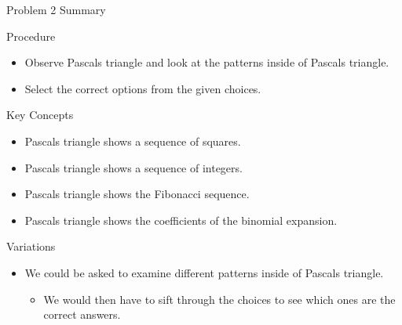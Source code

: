\begin{summary}{Problem 2 Summary}
    \begin{statement}{Procedure}
        \begin{itemize}
            \item Observe Pascals triangle and look at the patterns inside of Pascals triangle.
            \item Select the correct options from the given choices.
        \end{itemize}
    \end{statement}
    \begin{statement}{Key Concepts}
        \begin{itemize}
            \item Pascals triangle shows a sequence of squares.
            \item Pascals triangle shows a sequence of integers.
            \item Pascals triangle shows the Fibonacci sequence.
            \item Pascals triangle shows the coefficients of the binomial expansion.
        \end{itemize}
    \end{statement}
    \begin{statement}{Variations}
        \begin{itemize}
            \item We could be asked to examine different patterns inside of Pascals triangle.
            \begin{itemize}
                \item We would then have to sift through the choices to see which ones are the correct answers.
            \end{itemize}
        \end{itemize}
    \end{statement}
\end{summary}

